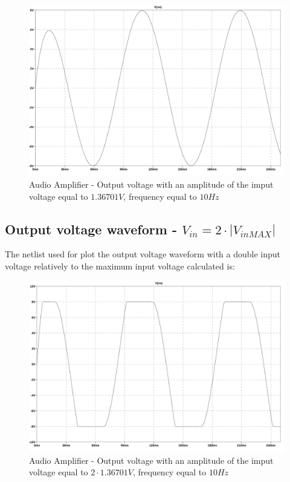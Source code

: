 \documentclass[10pt,a4paper]{book}
\begin{document}
\begin{figure}[H]
  \centering
  \includegraphics[width=14cm]{graph/1d4b.jpg}
  \caption{Audio Amplifier - Output voltage with an amplitude of the imput voltage equal to $1.36701V$, frequency equal to $10Hz$}
  \label{1d4bgraph}
\end{figure}

\subsection{Output voltage waveform - $V_{in} = 2 \cdot |V_{in MAX} |$}
The netlist used for plot the output voltage waveform with a double input voltage relatively to the maximum input voltage calculated is:\\


\begin{figure}[H]
  \centering
  \includegraphics[width=14cm]{graph/1d4c.jpg}
  \caption{Audio Amplifier - Output voltage with an amplitude of the imput voltage equal to $2 \cdot 1.36701V$, frequency equal to $10Hz$}
  \label{1d4cgraph}
\end{figure}
\end{document}
